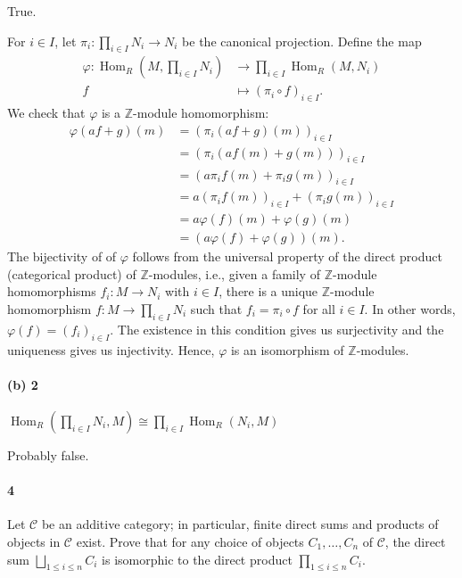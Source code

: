 \documentclass[12pt]{article}
\newlength{\myparskip}
\newenvironment{fullbox}{\begin{lrbox}{\savefullbox}\begin{minipage}{\dimexpr\textwidth-2\fboxsep\relax}\setlength{\parskip}{\myparskip}}{\end{minipage}\end{lrbox}\framebox[\textwidth]{\usebox{\savefullbox}}}
\newenvironment{pbox}[1][]{\begin{fullbox}\def\temp{#1}\ifx\temp\empty\else\paragraph{#1}\phantom{}\fi}{\end{fullbox}}
\theoremstyle{definition}
\newcommand{\Z}{\mathbb{Z}}
\renewcommand{\phi}{\varphi}
\newcommand{\<}{\langle}
\renewcommand{\>}{\rangle}
\newcommand{\iso}{\cong}
\renewcommand{\_}[1]{{_{#1}}}
\DeclareMathOperator{\Hom}{Hom}
\newcommand{\CC}{\mathcal{C}}
\begin{document}
True.

For $i \in I$, let $\pi_i : \prod_{i\in I} N_i \to N_i$ be the canonical projection.
Define the map
\begin{align*}
    \phi : \Hom_R(M, \textstyle\prod_{i\in I} N_i) &\to \textstyle\prod_{i\in I} \Hom_R(M, N_i) \\
        f &\mapsto (\pi_i \circ f)_{i \in I}.
\end{align*}
We check that $\phi$ is a $\Z$-module homomorphism:
\begin{align*}
    \phi(af + g)(m)
        &= (\pi_i(af + g)(m))_{i \in I} \\
        &= (\pi_i(af(m) + g(m)))_{i \in I} \\
        &= (a\pi_if(m) + \pi_ig(m))_{i \in I} \\
        &= a(\pi_if(m))_{i \in I} + (\pi_ig(m))_{i \in I} \\
        &= a\phi(f)(m) + \phi(g)(m) \\
        &= (a\phi(f) + \phi(g))(m).
\end{align*}
The bijectivity of of $\phi$ follows from the universal property of the direct product (categorical product) of $\Z$-modules, i.e., given a family of $\Z$-module homomorphisms $f_i : M \to N_i$ with $i \in I$, there is a unique $\Z$-module homomorphism $f : M \to \prod_{i \in I} N_i$ such that $f_i = \pi_i \circ f$ for all $i \in I$.
In other words, $\phi(f) = (f_i)_{i \in I}$.
The existence in this condition gives us surjectivity and the uniqueness gives us injectivity.
Hence, $\phi$ is an isomorphism of $\Z$-modules.



\begin{pbox}[(b) 2]
    $\Hom_R(\prod_{i\in I} N_i, M) \iso \prod_{i\in I} \Hom_R(N_i, M)$
\end{pbox}

Probably false.






\newpage
\begin{pbox}[4]
    Let $\CC$ be an additive category; in particular, finite direct sums and products of objects in $\CC$ exist. Prove that for any choice of objects $C_1, \dots, C_n$ of $\CC$, the direct sum $\bigsqcup_{1\leq i \leq n} C_i$ is isomorphic to the direct product $\prod_{1\leq i \leq n} C_i$.
\end{pbox}
\end{document}
